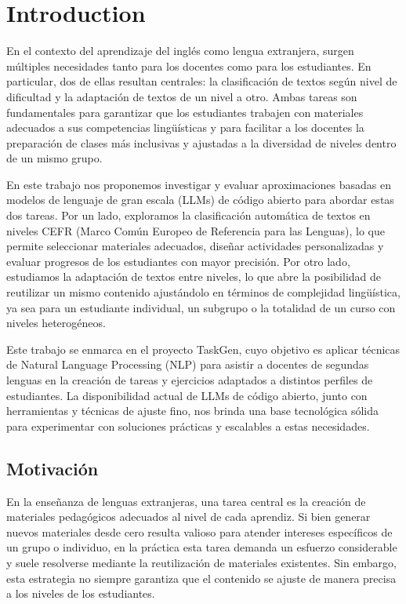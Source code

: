 \section{Introduction}
En el contexto del aprendizaje del inglés como lengua extranjera, surgen múltiples necesidades tanto para los docentes como para los estudiantes. En particular, dos de ellas resultan centrales: la clasificación de textos según nivel de dificultad y la adaptación de textos de un nivel a otro. Ambas tareas son fundamentales para garantizar que los estudiantes trabajen con materiales adecuados a sus competencias lingüísticas y para facilitar a los docentes la preparación de clases más inclusivas y ajustadas a la diversidad de niveles dentro de un mismo grupo.

En este trabajo nos proponemos investigar y evaluar aproximaciones basadas en modelos de lenguaje de gran escala (LLMs) de código abierto para abordar estas dos tareas. Por un lado, exploramos la clasificación automática de textos en niveles CEFR (Marco Común Europeo de Referencia para las Lenguas), lo que permite seleccionar materiales adecuados, diseñar actividades personalizadas y evaluar progresos de los estudiantes con mayor precisión. Por otro lado, estudiamos la adaptación de textos entre niveles, lo que abre la posibilidad de reutilizar un mismo contenido ajustándolo en términos de complejidad lingüística, ya sea para un estudiante individual, un subgrupo o la totalidad de un curso con niveles heterogéneos.

Este trabajo se enmarca en el proyecto TaskGen, cuyo objetivo es aplicar técnicas de Natural Language Processing (NLP) para asistir a docentes de segundas lenguas en la creación de tareas y ejercicios adaptados a distintos perfiles de estudiantes. La disponibilidad actual de LLMs de código abierto, junto con herramientas y técnicas de ajuste fino, nos brinda una base tecnológica sólida para experimentar con soluciones prácticas y escalables a estas necesidades.

\subsection{Motivación}
En la enseñanza de lenguas extranjeras, una tarea central es la creación de materiales pedagógicos adecuados al nivel de cada aprendiz. Si bien generar nuevos materiales desde cero resulta valioso para atender intereses específicos de un grupo o individuo, en la práctica esta tarea demanda un esfuerzo considerable y suele resolverse mediante la reutilización de materiales existentes. Sin embargo, esta estrategia no siempre garantiza que el contenido se ajuste de manera precisa a los niveles de los estudiantes.

